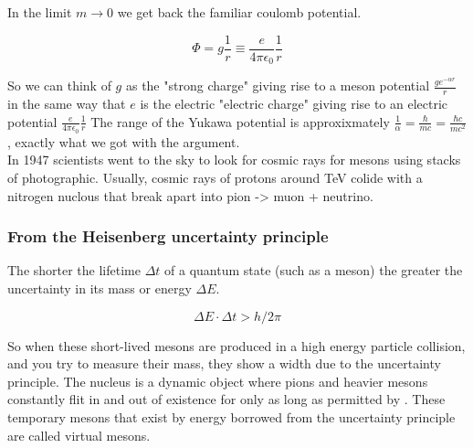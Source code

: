 \documentclass[english, 11pt]{article}
\begin{document}
      In the limit $m\rightarrow0$ we get back the familiar coulomb potential.

      \[ \Phi = g \frac{1}{r} \equiv \frac{e}{4\pi\epsilon_0}\frac{1}{r}\]

      So we can think of $g$ as the "strong charge" giving rise to a meson potential $\frac{ge^{-\alpha r}}{r}$ in the same way that $e$ is the electric "electric charge" giving rise to an electric potential $\frac{e}{4\pi\epsilon_0}\frac{1}{r}$ The range of the Yukawa potential is approxixmately $\frac{1}{\alpha} = \frac{\hbar}{mc} = \frac{\hbar c}{mc^2}$, exactly what we got with the  argument.\\
      In 1947 scientists went to the sky to look for cosmic rays for mesons using stacks of photographic. Usually, cosmic rays of protons around TeV colide with a nitrogen nuclous that break apart into pion -> muon + neutrino. 

      \subsubsection{From the Heisenberg uncertainty principle}
      The shorter the lifetime $\Delta t$ of a quantum state (such as a meson) the greater the uncertainty in its mass or energy $\Delta E$.

      \[ \Delta E \cdot \Delta t > h/2\pi\]

      So when these short-lived mesons are produced in a high energy particle collision, and you try to measure their mass, they show a width due to the uncertainty principle.
      The nucleus is a dynamic object where pions and heavier mesons constantly flit in and out of existence for only as long as permitted by . These temporary mesons that exist by energy borrowed from the uncertainty principle are called virtual mesons.

  
\end{document}

